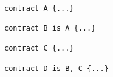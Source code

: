 \begin{lstlisting}[language=Solidity]

contract A {...}

contract B is A {...}

contract C {...}

contract D is B, C {...}
\end{lstlisting}